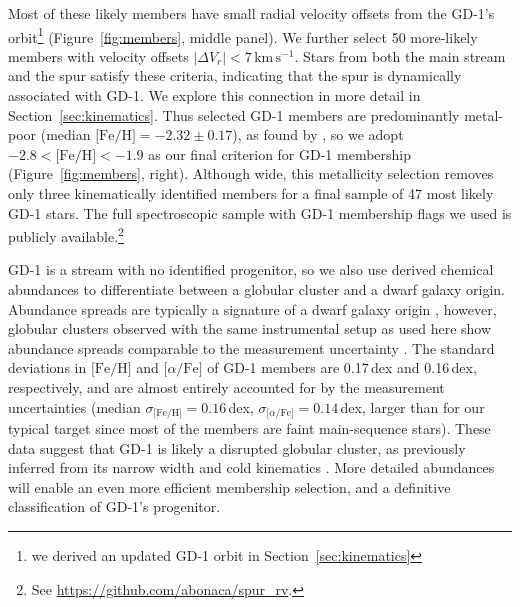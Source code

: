 \documentclass[twocolumn]{aastex63}
\newcommand{\kms}{\ensuremath{\textrm{km}\,\textrm{s}^{-1}}}
\newcommand{\feh}{\ensuremath{\textrm{[Fe/H]}}}
\newcommand{\afe}{\ensuremath{\textrm{[$\alpha$/Fe]}}}
\begin{document}
Most of these likely members have small radial velocity offsets from the GD-1's orbit\footnote{we derived an updated GD-1 orbit in Section~\ref{sec:kinematics}} (Figure~\ref{fig:members}, middle panel).
We further select 50 more-likely members with velocity offsets $|\Delta V_r| < 7\,\kms$.
Stars from both the main stream and the spur satisfy these criteria, indicating that the spur is dynamically associated with GD-1.
We explore this connection in more detail in Section~\ref{sec:kinematics}.
Thus selected GD-1 members are predominantly metal-poor (median $\feh=-2.32\pm0.17$), as found by \citet{malhan2019}, so we adopt $-2.8<\feh<-1.9$ as our final criterion for GD-1 membership (Figure~\ref{fig:members}, right).
Although wide, this metallicity selection removes only three kinematically identified members for a final sample of 47 most likely GD-1 stars.
The full spectroscopic sample with GD-1 membership flags we used is publicly available.\footnote{See \url{https://github.com/abonaca/spur_rv}.}

GD-1 is a stream with no identified progenitor, so we also use derived chemical abundances to differentiate between a globular cluster and a dwarf galaxy origin.
Abundance spreads are typically a signature of a dwarf galaxy origin \citep[e.g.,][]{willman2012}, however, globular clusters observed with the same instrumental setup as used here show abundance spreads comparable to the measurement uncertainty \citep[$\approx0.05-0.1$\,dex,][]{cargile2019}.
The standard deviations in $\feh$ and $\afe$ of GD-1 members are 0.17\,dex and 0.16\,dex, respectively, and are almost entirely accounted for by the measurement uncertainties (median $\sigma_\feh=0.16$\,dex, $\sigma_\afe=0.14$\,dex, larger than for our typical target since most of the members are faint main-sequence stars).
These data suggest that GD-1 is likely a disrupted globular cluster, as previously inferred from its narrow width \citep[e.g.,][]{grillmair2006} and cold kinematics \citep[e.g.,][]{malhan2019}.
More detailed abundances will enable an even more efficient membership selection, and a definitive classification of GD-1's progenitor.
\end{document}
